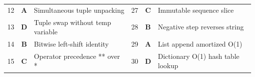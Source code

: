 \begin{center}
\begin{tabularx}{0.96\textwidth}{c c X c c X}
12 & \textbf{A} & Simultaneous tuple unpacking & 27 & \textbf{C} & Immutable sequence slice \\
13 & \textbf{D} & Tuple swap without temp variable & 28 & \textbf{B} & Negative step reverses string \\
14 & \textbf{B} & Bitwise left-shift identity & 29 & \textbf{A} & List append amortized O(1) \\
15 & \textbf{C} & Operator precedence ** over * & 30 & \textbf{D} & Dictionary O(1) hash table lookup \\
\bottomrule
\end{tabularx}
\end{center}
\vspace{{3mm}}
